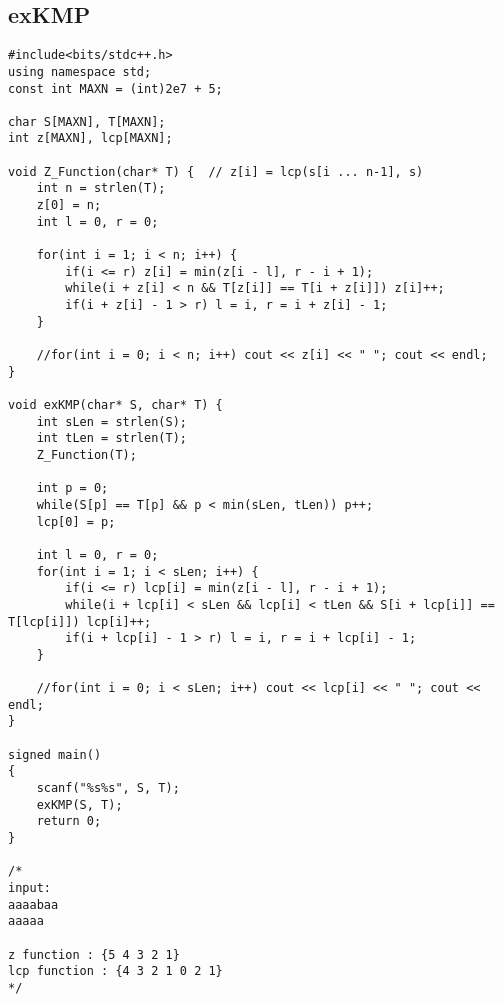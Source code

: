 \subsection{exKMP}
\begin{lstlisting}
#include<bits/stdc++.h>
using namespace std;
const int MAXN = (int)2e7 + 5;

char S[MAXN], T[MAXN];
int z[MAXN], lcp[MAXN];

void Z_Function(char* T) {	// z[i] = lcp(s[i ... n-1], s)
	int n = strlen(T);
	z[0] = n;
	int l = 0, r = 0;
	
	for(int i = 1; i < n; i++) {
		if(i <= r) z[i] = min(z[i - l], r - i + 1);
		while(i + z[i] < n && T[z[i]] == T[i + z[i]]) z[i]++;
		if(i + z[i] - 1 > r) l = i, r = i + z[i] - 1;
	}
	
	//for(int i = 0; i < n; i++) cout << z[i] << " "; cout << endl;
}

void exKMP(char* S, char* T) {
	int sLen = strlen(S);
	int tLen = strlen(T);
	Z_Function(T);
	
	int p = 0;
	while(S[p] == T[p] && p < min(sLen, tLen)) p++;
	lcp[0] = p;
	
	int l = 0, r = 0;
	for(int i = 1; i < sLen; i++) {
		if(i <= r) lcp[i] = min(z[i - l], r - i + 1);
		while(i + lcp[i] < sLen && lcp[i] < tLen && S[i + lcp[i]] == T[lcp[i]]) lcp[i]++;
		if(i + lcp[i] - 1 > r) l = i, r = i + lcp[i] - 1;
	}
	
	//for(int i = 0; i < sLen; i++) cout << lcp[i] << " "; cout << endl;
}

signed main()
{
	scanf("%s%s", S, T);
	exKMP(S, T);
	return 0;
}

/*
input:
aaaabaa
aaaaa

z function : {5 4 3 2 1}
lcp function : {4 3 2 1 0 2 1} 
*/
\end{lstlisting}

